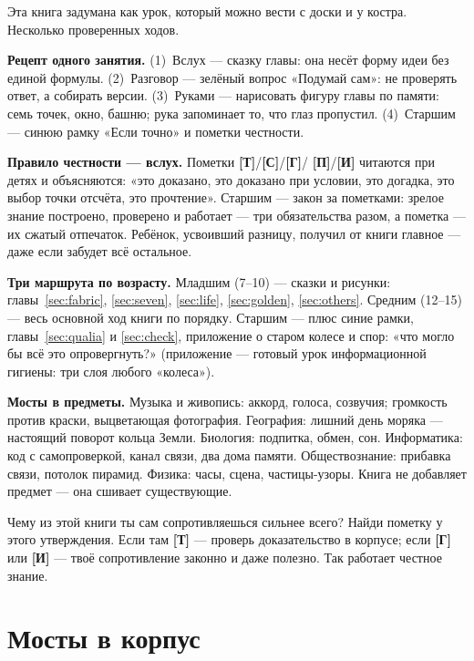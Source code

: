 \documentclass[11pt,letterpaper]{article}
\newcommand{\stT}{\textbf{[Т]}\xspace}
\newcommand{\stC}{\textbf{[С]}\xspace}
\newcommand{\stP}{\textbf{[П]}\xspace}
\newcommand{\stI}{\textbf{[И]}\xspace}
\newcommand{\stH}{\textbf{[Г]}\xspace}
\begin{document}
Эта книга задумана как урок, который можно вести с доски и у костра.
Несколько проверенных ходов.

\textbf{Рецепт одного занятия.} (1)~Вслух --- сказку главы: она
несёт форму идеи без единой формулы. (2)~Разговор --- зелёный вопрос
«Подумай сам»: не проверять ответ, а собирать версии. (3)~Руками ---
нарисовать фигуру главы по памяти: семь точек, окно, башню; рука
запоминает то, что глаз пропустил. (4)~Старшим --- синюю рамку «Если
точно» и пометки честности.

\textbf{Правило честности --- вслух.} Пометки \stT{}/\stC{}/\stH{}/%
\stP{}/\stI{} читаются при детях и объясняются: «это доказано, это
доказано при условии, это догадка, это выбор точки отсчёта, это
прочтение». Старшим --- закон за пометками: зрелое знание
построено, проверено и работает --- три обязательства разом, а
пометка --- их сжатый отпечаток. Ребёнок, усвоивший разницу,
получил от книги главное ---
даже если забудет всё остальное.

\textbf{Три маршрута по возрасту.} Младшим (7--10) --- сказки и
рисунки: главы~\ref{sec:fabric}, \ref{sec:seven}, \ref{sec:life},
\ref{sec:golden}, \ref{sec:others}. Средним (12--15) --- весь
основной ход книги по порядку. Старшим --- плюс синие рамки,
главы~\ref{sec:qualia} и \ref{sec:check}, приложение о старом колесе и
спор: «что могло
бы всё это опровергнуть?» (приложение --- готовый урок
информационной гигиены: три слоя любого «колеса»).

\textbf{Мосты в предметы.} Музыка и живопись: аккорд, голоса,
созвучия; громкость против краски, выцветающая фотография.
География: лишний день моряка --- настоящий поворот кольца Земли.
Биология: подпитка, обмен, сон. Информатика: код с
самопроверкой, канал связи, два дома памяти. Обществознание:
прибавка связи, потолок пирамид. Физика: часы, сцена, частицы-узоры.
Книга не добавляет предмет --- она сшивает существующие.

\begin{askbox}
Чему из этой книги ты сам сопротивляешься сильнее всего? Найди
пометку у этого утверждения. Если там \stT{} --- проверь
доказательство в корпусе; если \stH{} или \stI{} --- твоё
сопротивление законно и даже полезно. Так работает честное знание.
\end{askbox}

\clearpage
\section*{Мосты в корпус}
\end{document}
